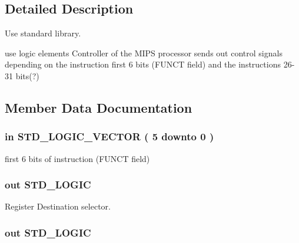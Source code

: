 \subsection{\-Detailed \-Description}
\-Use standard library. 

use logic elements \-Controller of the \-M\-I\-P\-S processor sends out control signals depending on the instruction first 6 bits (\-F\-U\-N\-C\-T field) and the instructions 26-\/31 bits(?) 

\subsection{\-Member \-Data \-Documentation}
\hypertarget{class_control_a837426aa7a23a4b3f1534d7a5a47fd84}{
\subsubsection[{\-Instruction\-\_\-funct}]{ {\bfseries in } {\bfseries \-S\-T\-D\-\_\-\-L\-O\-G\-I\-C\-\_\-\-V\-E\-C\-T\-O\-R (   5    downto    0  ) } }}\label{class_control_a837426aa7a23a4b3f1534d7a5a47fd84}


first 6 bits of instruction (\-F\-U\-N\-C\-T field) 

\hypertarget{class_control_a3e8450f5ca7972a364f6eaffec9c86a2}{
\subsubsection[{\-Reg\-Dst}]{ {\bfseries out } {\bfseries \-S\-T\-D\-\_\-\-L\-O\-G\-I\-C } }}\label{class_control_a3e8450f5ca7972a364f6eaffec9c86a2}


\-Register \-Destination selector. 

\hypertarget{class_control_aec5087b6dc490446af52e39d0264cf50}{
\subsubsection[{\-A\-L\-U\-Src}]{ {\bfseries out } {\bfseries \-S\-T\-D\-\_\-\-L\-O\-G\-I\-C } }}\label{class_control_aec5087b6dc490446af52e39d0264cf50}


